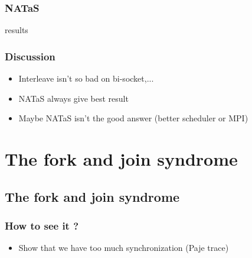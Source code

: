\documentclass[oneside,12t]{classes/Thesis}
\begin{document}
\subsection{NATaS}
results
\subsection{Discussion}
  \begin{itemize}
    \item Interleave isn't so bad on bi-socket,...
    \item NATaS always give best result
    \item Maybe NATaS isn't the good answer (better scheduler or MPI)
  \end{itemize}


\chapter{The fork and join syndrome}
\minitoc
\vspace{1cm}


\section{The fork and join syndrome}
\subsection{How to see it ?}
  \begin{itemize}
    \item Show that we have too much synchronization (Paje trace)
  \end{itemize}
\end{document}
